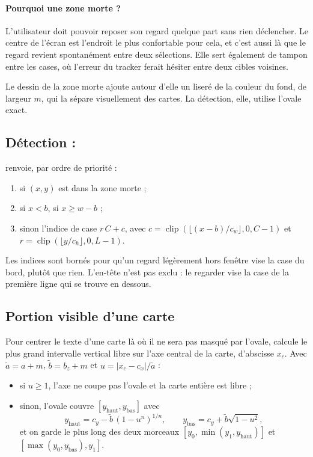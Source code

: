 \paragraph{Pourquoi une zone morte ?} L'utilisateur doit pouvoir reposer son regard quelque part sans rien déclencher. Le centre de l'écran est l'endroit le plus confortable pour cela, et c'est aussi là que le regard revient spontanément entre deux sélections. Elle sert également de tampon entre les cases, où l'erreur du tracker ferait hésiter entre deux cibles voisines.

Le dessin de la zone morte ajoute autour d'elle un liseré de la couleur du fond, de largeur $m$, qui la sépare visuellement des cartes. La détection, elle, utilise l'ovale exact.

\subsection{\texorpdfstring{Détection : }{Détection : zone_at}}

 renvoie, par ordre de priorité :
\begin{enumerate}
  \item {} si $(x, y)$ est dans la zone morte ;
  \item {} si $x < b$,  si $x \geq w - b$ ;
  \item sinon l'indice de case $r\,C + c$, avec $c = \operatorname{clip}(\lfloor (x - b)/c_w \rfloor, 0, C - 1)$ et $r = \operatorname{clip}(\lfloor y/c_h \rfloor, 0, L - 1)$.
\end{enumerate}
Les indices sont bornés pour qu'un regard légèrement hors fenêtre vise la case du bord, plutôt que rien. L'en-tête n'est pas exclu : le regarder vise la case de la première ligne qui se trouve en dessous.

\subsection{Portion visible d'une carte}

Pour centrer le texte d'une carte là où il ne sera pas masqué par l'ovale,  calcule le plus grand intervalle vertical libre sur l'axe central de la carte, d'abscisse $x_c$. Avec $\tilde a = a + m$, $\tilde b = b_z + m$ et $u = |x_c - c_x| / \tilde a$ :
\begin{itemize}
  \item si $u \geq 1$, l'axe ne coupe pas l'ovale et la carte entière est libre ;
  \item sinon, l'ovale couvre $[y_\text{haut}, y_\text{bas}]$ avec
  \begin{equation}
    y_\text{haut} = c_y - \tilde b\,(1 - u^n)^{1/n}, \qquad y_\text{bas} = c_y + \tilde b\sqrt{1 - u^2},
  \end{equation}
  et on garde le plus long des deux morceaux $[y_0, \min(y_1, y_\text{haut})]$ et $[\max(y_0, y_\text{bas}), y_1]$.
\end{itemize}


